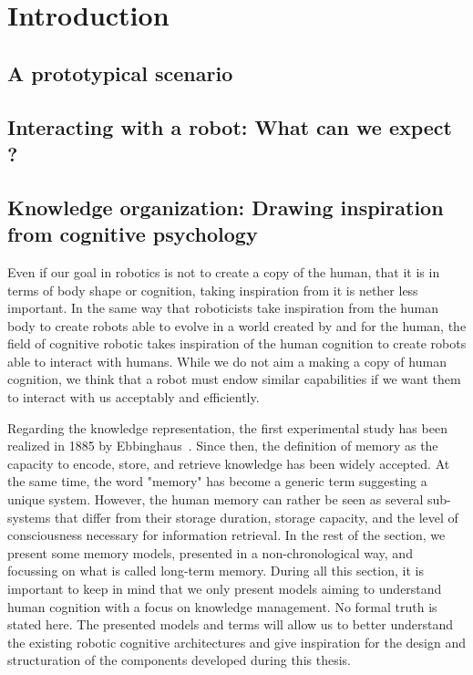
\ifdefined{}
\else
\setcounter{chapter}{0} %
\dominitoc
\faketableofcontents
\fi

\chapter{Introduction}
\minitoc

\section{A prototypical scenario}

\section{Interacting with a robot: What can we expect ?}

\section{Knowledge organization: Drawing inspiration from cognitive psychology }

Even if our goal in robotics is not to create a copy of the human, that it is in terms of body shape or cognition, taking inspiration from it is nether less important. In the same way that roboticists take inspiration from the human body to create robots able to evolve in a world created by and for the human, the field of cognitive robotic takes inspiration of the human cognition to create robots able to interact with humans. While we do not aim a making a copy of human cognition, we think that a robot must endow similar capabilities if we want them to interact with us acceptably and efficiently.

Regarding the knowledge representation, the first experimental study has been realized in 1885 by Ebbinghaus~\cite{ebbinghaus_1885_gedachtnis}. Since then, the definition of memory as the capacity to encode, store, and retrieve knowledge \cite{roediger_1996_retrieval} has been widely accepted. At the same time, the word "memory" has become a generic term suggesting a unique system. However, the human memory can rather be seen as several sub-systems that differ from their storage duration, storage capacity, and the level of consciousness necessary for information retrieval. In the rest of the section, we present some memory models, presented in a non-chronological way, and focussing on what is called long-term memory. During all this section, it is important to keep in mind that we only present models aiming to understand human cognition with a focus on knowledge management. No formal truth is stated here. The presented models and terms will allow us to better understand the existing robotic cognitive architectures and give inspiration for the design and structuration of the components developed during this thesis.

